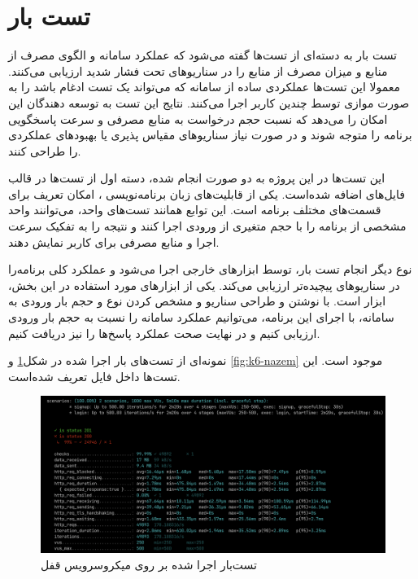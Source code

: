 \section{تست بار}
تست بار به دسته‌ای از تست‌ها گفته می‌شود که عملکرد سامانه و الگوی مصرف از منابع و میزان مصرف از منابع را در سناریو‌های تحت فشار شدید ارزیابی می‌کنند. معمولا این تست‌ها عملکردی ساده از سامانه که می‌تواند یک تست ادغام باشد را به صورت موازی توسط چندین کاربر اجرا می‌کنند. نتایج این تست به توسعه دهندگان این امکان را می‌دهد که نسبت حجم درخواست به منابع مصرفی و سرعت پاسخگویی برنامه را متوجه شوند و در صورت نیاز سناریو‌های مقیاس پذیری یا بهبود‌های عملکردی را طراحی کنند.

این تست‌ها در این پروژه به دو صورت انجام شده، دسته اول از تست‌ها در قالب فایل‌های  اضافه شده‌است. یکی از قابلیت‌های زبان برنامه‌نویسی ، امکان تعریف  برای قسمت‌های مختلف برنامه است. این توابع همانند تست‌های واحد، می‌توانند واحد مشخصی از برنامه را با حجم متغیری از ورودی اجرا کنند و نتیجه را به تفکیک سرعت اجرا و منابع مصرفی برای کاربر نمایش دهند. 


نوع دیگر انجام تست بار، توسط ابزار‌های خارجی اجرا می‌شود و عملکرد کلی برنامه‌را در سناریو‌های پیچیده‌تر ارزیابی می‌کند. یکی از ابزار‌های مورد استفاده در این بخش، ابزار  است. با نوشتن و طراحی سناریو و مشخص کردن نوع و حجم بار ورودی به سامانه، با اجرای این برنامه، می‌توانیم عملکرد سامانه را نسبت به حجم بار ورودی ارزیابی کنیم و در نهایت صحت عملکرد پاسخ‌ها را نیز دریافت کنیم.

نمونه‌ای از تست‌های بار اجرا شده در شکل\ref{fig:k6-ghofl} و \ref{fig:k6-nazem} موجود است. این تست‌ها داخل فایل  تعریف شده‌است.

\begin{figure}
	\centering
	\includegraphics[width=1\linewidth]{figures/k6-ghofl}
	\caption{تست‌بار اجرا شده بر روی میکروسرویس قفل}
	\label{fig:k6-ghofl}
\end{figure}

